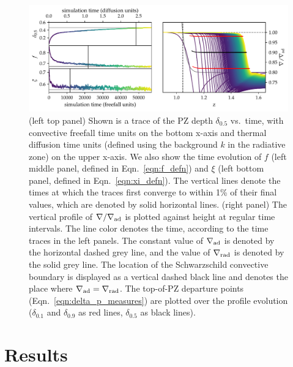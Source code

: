 \documentclass[twocolumn]{aastex631}
\newcommand{\gradrad}{\ensuremath{\nabla_{\rm{rad}}}}
\newcommand{\gradad}{\ensuremath{\nabla_{\rm{ad}}}}
\newcommand{\justgrad}{\ensuremath{\nabla}}
\begin{document}
\begin{figure}[t]
\centering
\includegraphics[width=\textwidth]{time_evolution.pdf}
\caption{
(left top panel) Shown is a trace of the PZ depth $\delta_{0.5}$ vs.~time, with convective freefall time units on the bottom x-axis and thermal diffusion time units (defined using the background $k$ in the radiative zone) on the upper x-axis.
We also show the time evolution of $f$ (left middle panel, defined in Eqn.~\ref{eqn:f_defn}) and $\xi$ (left bottom panel, defined in Eqn.~\ref{eqn:xi_defn}).
The vertical lines denote the times at which the traces first converge to within 1\% of their final values, which are denoted by solid horizontal lines.
(right panel) The vertical profile of $\justgrad/\gradad$ is plotted against height at regular time intervals.
The line color denotes the time, according to the time traces in the left panels.
The constant value of $\gradad$ is denoted by the horizontal dashed grey line, and the value of $\gradrad$ is denoted by the solid grey line.
The location of the Schwarzschild convective boundary is displayed as a vertical dashed black line and denotes the place where $\gradad = \gradrad$.
The top-of-PZ departure points (Eqn.~\ref{eqn:delta_p_measures}) are plotted over the profile evolution ($\delta_{0.1}$ and $\delta_{0.9}$ as red lines, $\delta_{0.5}$ as black lines).
\label{fig:time_evolution}
}
\end{figure}



\section{Results}
\label{sec:results}
\end{document}
